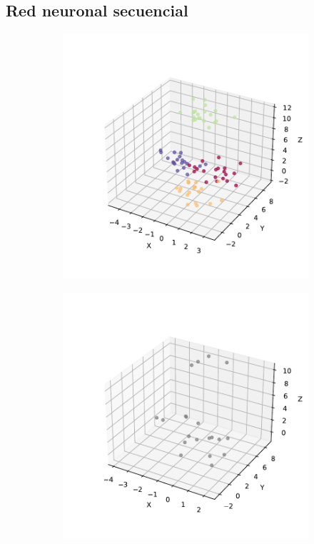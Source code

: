 \cite{pytorch}

\subsection{Red neuronal secuencial}

\begin{figure}[h]
  \centering
  \begin{subfigure}{0.45\textwidth}
    \centering
    \includegraphics[width=\textwidth]{figures/train-asig-artificial.pdf}
    \caption{}
    \label{fig:}
  \end{subfigure}
  \begin{subfigure}{0.45\textwidth}
    \centering
    \includegraphics[width=\textwidth]{figures/test-artificial.pdf}

\end{subfigure}
\end{figure}
